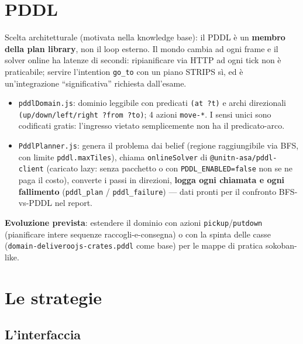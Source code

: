 \documentclass[11pt,a4paper]{article}
\newcommand{\file}[1]{\texttt{#1}}
\newcommand{\code}[1]{\texttt{#1}}
\begin{document}
\section{PDDL}

Scelta architetturale (motivata nella knowledge base): il PDDL è un
\textbf{membro della plan library}, non il loop esterno. Il mondo cambia ad
ogni frame e il solver online ha latenze di secondi: ripianificare via HTTP
ad ogni tick non è praticabile; servire l'intention \code{go\_to} con un
piano STRIPS sì, ed è un'integrazione ``significativa'' richiesta
dall'esame.

\begin{itemize}
  \item \file{pddlDomain.js}: dominio leggibile con predicati
    \code{(at ?t)} e archi direzionali \code{(up/down/left/right ?from ?to)};
    4 azioni \code{move-*}. I sensi unici sono codificati gratis:
    l'ingresso vietato semplicemente non ha il predicato-arco.
  \item \file{PddlPlanner.js}: genera il problema dai belief (regione
    raggiungibile via BFS, con limite \code{pddl.maxTiles}), chiama
    \code{onlineSolver} di \code{@unitn-asa/pddl-client} (caricato lazy:
    senza pacchetto o con \code{PDDL\_ENABLED=false} non se ne paga il
    costo), converte i passi in direzioni, \textbf{logga ogni chiamata e
    ogni fallimento} (\code{pddl\_plan} / \code{pddl\_failure}) — dati
    pronti per il confronto BFS-vs-PDDL nel report.
\end{itemize}

\textbf{Evoluzione prevista}: estendere il dominio con azioni
\code{pickup}/\code{putdown} (pianificare intere sequenze
raccogli-e-consegna) o con la spinta delle casse
(\code{domain-deliveroojs-crates.pddl} come base) per le mappe di pratica
sokoban-like.

\section{Le strategie}\label{sec:strategie}

\subsection{L'interfaccia}
\end{document}
